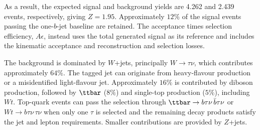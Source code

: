 \begin{table}[htbp]
    \centering
    \small
    \caption{Signal and background cutflow for $\bTagSR$-$\Res$. The signal is evaluated at $(\MU,\gU,\beta_L^{23})=(1.5~\TeV,1.5,0.6)$.}
    \label{tab:ch7_cutflow_res}
    \setlength{\tabcolsep}{3pt}
\end{table}

As a result, the expected signal and background yields are 4.262 and 2.439 events, respectively, giving $Z=1.95$.
Approximately $12\%$ of the signal events passing the one-$b$-jet baseline are retained.
The acceptance times selection efficiency, $A\epsilon$, instead uses the total generated signal as its reference and includes the kinematic acceptance and reconstruction and selection losses.

The background is dominated by $W$+jets, principally $W\to\tau\nu$, which contributes approximately $64\%$.
The tagged jet can originate from heavy-flavour production or a misidentified light-flavour jet.
Approximately $16\%$ is contributed by diboson production, followed by $\ttbar$ ($8\%$) and single-top production ($5\%$), including $Wt$.
Top-quark events can pass the selection through $\ttbar\to b\tau\nu\,\bar b\tau\nu$ or $Wt\to b\tau\nu\,\tau\nu$ when only one $\tau$ is selected and the remaining decay products satisfy the jet and lepton requirements.
Smaller contributions are provided by $Z$+jets.


